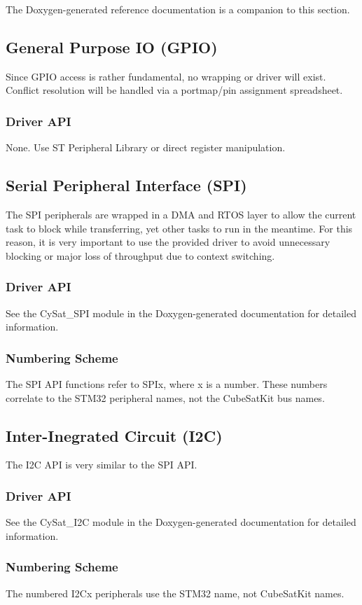 \documentclass[10pt]{extarticle}
\begin{document}
The Doxygen-generated reference documentation is a companion to this section.

\subsection{General Purpose IO (GPIO)}
Since GPIO access is rather fundamental, no wrapping or driver will exist. Conflict
resolution will be handled via a portmap/pin assignment spreadsheet.
\subsubsection{Driver API}
None. Use ST Peripheral Library or direct register manipulation.

\subsection{Serial Peripheral Interface (SPI)}
The SPI peripherals are wrapped in a DMA and RTOS layer to allow the current
task to block while transferring, yet other tasks to run in the meantime.
For this reason, it is very important to use the provided driver to avoid
unnecessary blocking or major loss of throughput due to context switching.
\subsubsection{Driver API}
See the CySat\_SPI module in the Doxygen-generated documentation for detailed
information.
\subsubsection{Numbering Scheme}
The SPI API functions refer to SPIx, where x is a number. These numbers
correlate to the STM32 peripheral names, not the CubeSatKit bus names.

\subsection{Inter-Inegrated Circuit (I2C)}
The I2C API is very similar to the SPI API.
\subsubsection{Driver API}
See the CySat\_I2C module in the Doxygen-generated documentation for detailed
information.
\subsubsection{Numbering Scheme}
The numbered I2Cx peripherals use the STM32 name, not CubeSatKit names.
\end{document}

